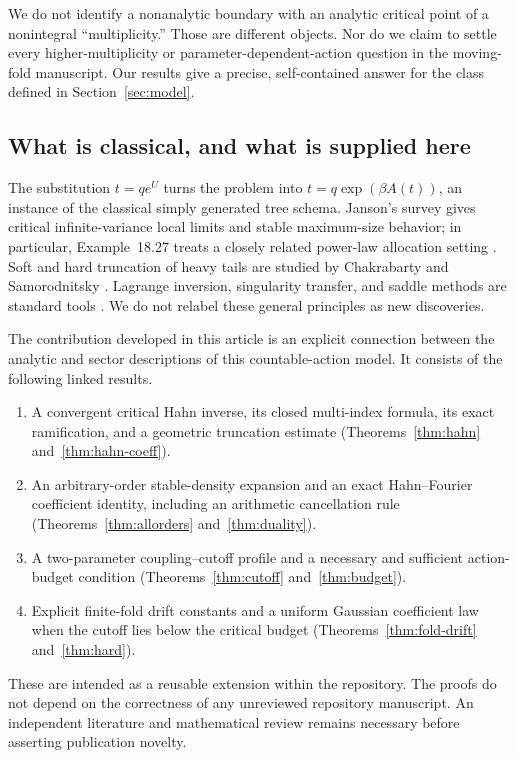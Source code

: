 \documentclass[11pt,a4paper]{article}
\numberwithin{equation}{section}
\theoremstyle{definition}
\theoremstyle{remark}
\begin{document}
We do not identify a nonanalytic boundary with an analytic critical point
of a nonintegral ``multiplicity.'' Those are different objects. Nor do we
claim to settle every higher-multiplicity or parameter-dependent-action
question in the moving-fold manuscript. Our results give a precise,
self-contained answer for the class defined in Section~\ref{sec:model}.

\subsection{What is classical, and what is supplied here}
The substitution $t=qe^U$ turns the problem into
$t=q\exp(\beta A(t))$, an instance of the classical simply generated tree
schema. Janson's survey gives critical infinite-variance local limits and
stable maximum-size behavior; in particular, Example~18.27 treats a
closely related power-law allocation setting \cite{janson}. Soft and hard
truncation of heavy tails are studied by Chakrabarty and Samorodnitsky
\cite{chakrabarty}. Lagrange inversion, singularity transfer, and saddle
methods are standard tools \cite{flajolet}. We do not relabel these general
principles as new discoveries.

The contribution developed in this article is an explicit connection
between the analytic and sector descriptions of this countable-action
model. It consists of the following linked results.
\begin{enumerate}[label=\arabic*.,leftmargin=*]
\item A convergent critical Hahn inverse, its closed multi-index formula,
its exact ramification, and a geometric truncation estimate
(Theorems~\ref{thm:hahn} and~\ref{thm:hahn-coeff}).
\item An arbitrary-order stable-density expansion and an exact
Hahn--Fourier coefficient identity, including an arithmetic cancellation
rule (Theorems~\ref{thm:allorders} and~\ref{thm:duality}).
\item A two-parameter coupling--cutoff profile and a necessary and
sufficient action-budget condition
(Theorems~\ref{thm:cutoff} and~\ref{thm:budget}).
\item Explicit finite-fold drift constants and a uniform Gaussian
coefficient law when the cutoff lies below the critical budget
(Theorems~\ref{thm:fold-drift} and~\ref{thm:hard}).
\end{enumerate}
These are intended as a reusable extension within the repository. The
proofs do not depend on the correctness of any unreviewed repository
manuscript. An independent literature and mathematical review remains
necessary before asserting publication novelty.
\end{document}
